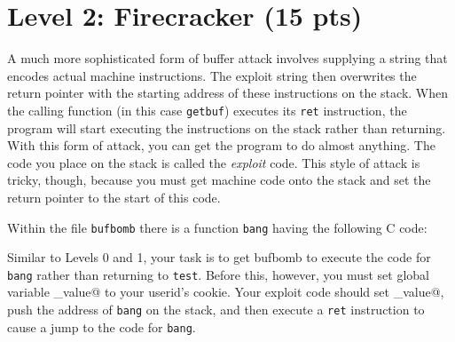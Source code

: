\documentclass[11pt]{article}
\newenvironment{ccode}%
{\small}%
{}
\begin{document}
\section*{Level 2: Firecracker (15 pts)}

A much more sophisticated form of buffer attack involves supplying a
string that encodes actual machine instructions.  The exploit string
then overwrites the return pointer with the starting address of these
instructions on the stack.  When the calling function (in this case
{\tt getbuf}) executes its {\tt ret} instruction, the program will
start executing the instructions on the stack rather than returning.
With this form of attack, you can get the program to do almost
anything.  The code you place on the stack is called the {\em exploit}
code.  This style of attack is tricky, though, because you must get
machine code onto the stack and set the return pointer to the start of
this code.

Within the file {\tt bufbomb} there is a function {\tt bang}
having the following C code:

\begin{ccode}

\end{ccode}

Similar to Levels 0 and 1, your task is to get {\sc bufbomb} to
execute the code for {\tt bang} rather than returning to {\tt test}.
Before this, however, you must set global variable \verb@global_value@
to your userid's cookie.  Your exploit code should set
\verb@global_value@, push the address of \texttt{bang} on the stack,
and then execute a \texttt{ret} instruction to cause a jump to the
code for \texttt{bang}.
\end{document}
